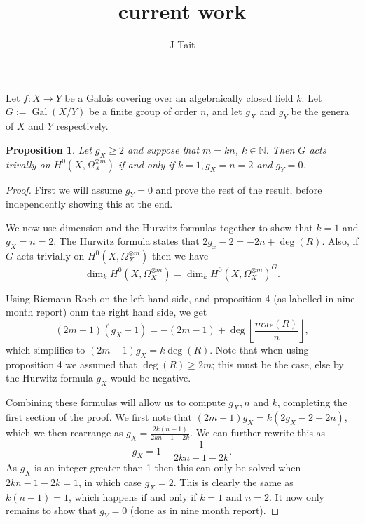 \documentclass[11pt]{article} %
\title{current work}
\author{J Tait}
\newtheorem{prop}{Proposition}
\DeclareMathOperator{\gal}{Gal}
\begin{document}
\maketitle

Let $f:X\rightarrow Y$ be a Galois covering over an algebraically closed field $k$.
Let $G:=\gal (X/Y)$ be a finite group of order $n$, and let $g_X$ and $g_Y$ be the genera of $X$ and $Y$ respectively.

\begin{prop}
  Let $g_X\geq 2$ and suppose that $m=kn$, $k\in \mathbb{N}$.
  Then $G$ acts trivally on $H^0(X,\Omega_X^{\otimes m})$ if and only if $k=1,g_X=n=2$ and $g_Y=0$.
\end{prop}

\begin{proof}
  First we will assume $g_Y=0$ and prove the rest of the result, before independently showing this at the end.

  We now use dimension and the Hurwitz formulas together to show that $k=1$ and $g_X=n=2$.
  The Hurwitz formula states that $2g_x-2=-2n+\deg(R)$.
  Also, if $G$ acts trivially on $H^0(X,\Omega_X^{\otimes m})$ then we have
    \begin{equation*}
      \dim_kH^0(X,\Omega_X^{\otimes m})=\dim_kH^0(X,\Omega_X^{\otimes m})^G.
    \end{equation*}

  Using Riemann-Roch on the left hand side, and proposition 4 (as labelled in nine month report) onm the right hand side, we get
    \begin{equation*}
      (2m-1)(g_X-1)=-(2m-1)+\deg\left\lfloor\frac{m\pi_*(R)}{n}\right\rfloor,
    \end{equation*}
  which simplifies to $(2m-1)g_X=k\deg(R)$.
  Note that when using proposition 4 we assumed that $\deg(R)\geq 2m$; this must be the case, else by the Hurwitz formula $g_X$ would be negative.

  Combining these formulas will allow us to compute $g_X,n$ and $k$, completing the first section of the proof.
  We first note that $(2m-1)g_X=k(2g_X-2+2n)$, which we then rearrange as $g_X=\frac{2k(n-1)}{2kn-1-2k}$.
  We can further rewrite this as
    \begin{equation*}
      g_X=1+\frac{1}{2kn-1-2k}.
    \end{equation*}
  As $g_X$ is an integer greater than 1 then this can only be solved when $2kn-1-2k=1$, in which case $g_X=2$.
  This is clearly the same as $k(n-1)=1$, which happens if and only if $k=1$ and $n=2$.
  It now only remains to show that $g_Y=0$ (done as in nine month report).


\end{proof}
\end{document}

